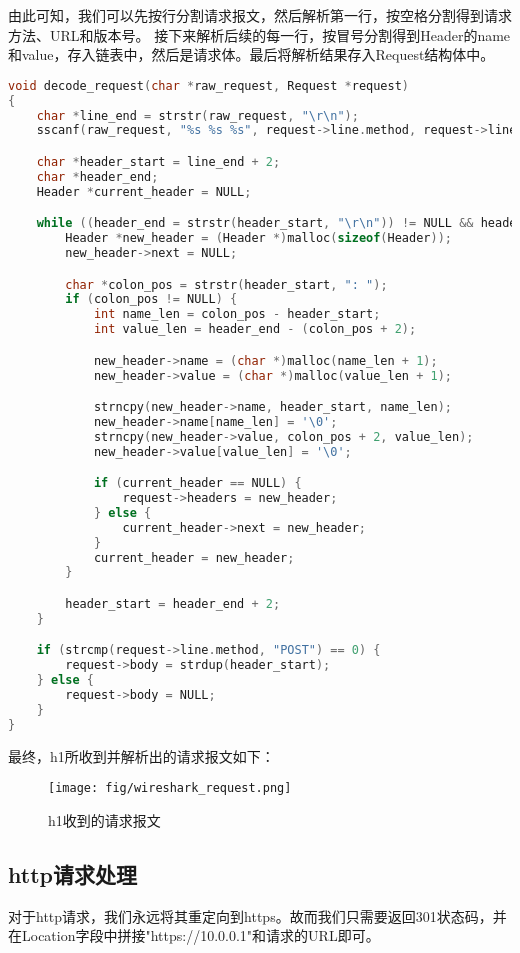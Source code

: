 \documentclass[11pt]{article}
\begin{document}
由此可知，我们可以先按行分割请求报文，然后解析第一行，按空格分割得到请求方法、URL和版本号。
接下来解析后续的每一行，按冒号分割得到Header的name和value，存入链表中，然后是请求体。最后将解析结果存入Request结构体中。
\begin{lstlisting}[language=C]
void decode_request(char *raw_request, Request *request)
{
    char *line_end = strstr(raw_request, "\r\n");
    sscanf(raw_request, "%s %s %s", request->line.method, request->line.url, request->line.version);

    char *header_start = line_end + 2;
    char *header_end;
    Header *current_header = NULL;

    while ((header_end = strstr(header_start, "\r\n")) != NULL && header_end != header_start) {
        Header *new_header = (Header *)malloc(sizeof(Header));
        new_header->next = NULL;

        char *colon_pos = strstr(header_start, ": ");
        if (colon_pos != NULL) {
            int name_len = colon_pos - header_start;
            int value_len = header_end - (colon_pos + 2);

            new_header->name = (char *)malloc(name_len + 1);
            new_header->value = (char *)malloc(value_len + 1);

            strncpy(new_header->name, header_start, name_len);
            new_header->name[name_len] = '\0';
            strncpy(new_header->value, colon_pos + 2, value_len);
            new_header->value[value_len] = '\0';

            if (current_header == NULL) {
                request->headers = new_header;
            } else {
                current_header->next = new_header;
            }
            current_header = new_header;
        }

        header_start = header_end + 2;
    }

    if (strcmp(request->line.method, "POST") == 0) {
        request->body = strdup(header_start);
    } else {
        request->body = NULL;
    }
}
\end{lstlisting}

最终，h1所收到并解析出的请求报文如下：
\begin{figure}[H]
\centering
\texttt{[image: fig/wireshark\_request.png]}
\caption{h1收到的请求报文}
\end{figure}

\subsection{http请求处理}
对于http请求，我们永远将其重定向到https。故而我们只需要返回301状态码，并在Location字段中拼接"https://10.0.0.1"和请求的URL即可。
\end{document}
